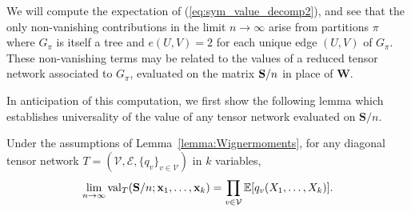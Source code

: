 \documentclass[10pt,reqno]{amsart}
\def\S{\mathbf{S}}
\def\E{\mathbb{E}}
\def\cV{\mathcal{V}}
\def\cE{\mathcal{E}}
\def\val{\operatorname{val}}
\def\bW{{\mathbf{W}}}
\def\bx{\mathbf{x}}
\begin{document}
We will compute the expectation of (\ref{eq:sym_value_decomp2}), and see that
the only non-vanishing contributions in the limit $n \to \infty$
arise from partitions $\pi$ where $G_\pi$ is itself a tree and
$e(U,V)=2$ for each unique edge $(U,V)$ of $G_\pi$. These non-vanishing terms
may be related to the values of a reduced tensor network associated to
$G_\pi$, evaluated on the matrix $\mathbf{S}/n$ in place of $\bW$.

In anticipation of this computation, we first show the following
lemma which establishes universality of the value of any tensor network
evaluated on $\S/n$.

\begin{lemma}\label{lem:VarianceProfile_universality}
Under the assumptions of Lemma~\ref{lemma:Wignermoments}, for any diagonal 
tensor network $T=(\cV,\cE,\{q_v\}_{v \in \cV})$ in $k$ variables,
\begin{align*}
\lim_{n \to \infty}
\val_{T}(\bS/n; \bx_1,\ldots,\bx_k)=\prod_{v \in \cV}
\E[q_v(X_1,\ldots,X_k)].
\end{align*}
\end{lemma}
\end{document}

